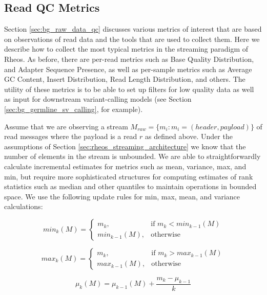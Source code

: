 \subsection{Read QC Metrics}
\label{sec:main_body_read_qc_metrics}

Section \ref{sec:bg_raw_data_qc} discusses various metrics of interest that are based on observations of read data and the tools that are used to collect them. Here we describe how to collect the most typical metrics in the streaming paradigm of Rheos. As before, there are per-read metrics such as Base Quality Distribution, and Adapter Sequence Presence, as well as per-sample metrics such as Average GC Content, Insert Distribution, Read Length Distribution, and others. The utility of these metrics is to be able to set up filters for low quality data as well as input for downstream variant-calling models (see Section \ref{sec:bg_germline_sv_calling}, for example). 

Assume that we are observing a stream $M_{raw} = \{m_i: m_i = (header, payload)\}$ of read messages where the payload is a read $r$ as defined above. Under the assumptions of Section \ref{sec:rheos_streaming_architecture} we know that the number of elements in the stream is unbounded. We are able to straightforwardly calculate incremental estimates for metrics such as mean, variance, max, and min, but require more sophisticated structures for computing estimates of rank statistics such as median and other quantiles to maintain operations in bounded space. We use the following update rules for min, max, mean, and variance\autocite{welford1962note} calculations:

\begin{equation}
    \label{eq:stream_min}
    min_k(M) =  \begin{cases}
        m_k,& \text{if } m_k < min_{k-1}(M)\\
        min_{k-1}(M),& \text{otherwise}
    \end{cases}
\end{equation}

\begin{equation}
    \label{eq:stream_max}
    max_k(M) =  \begin{cases}
        m_k,& \text{if } m_k > max_{k-1}(M)\\
        max_{k-1}(M),& \text{otherwise}
    \end{cases}
\end{equation}

\begin{equation}
    \label{eq:stream_mean}
    \mu_k(M) =  \mu_{k-1}(M) + \frac {m_k - \mu_{k-1}} {k} 
\end{equation}

